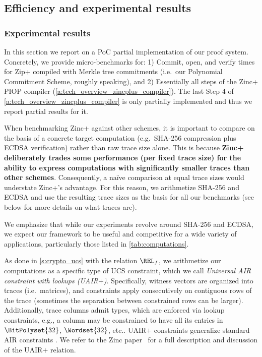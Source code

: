 \subsection{Efficiency and experimental results}
\label{sec:experiments}

\subsubsection{Experimental results}
In this section we report on a PoC partial implementation of our proof system. Concretely, we provide micro-benchmarks for: 1) Commit, open, and verify times for Zip+ compiled with Merkle tree commitments (i.e.\ our Polynomial Commitment Scheme, roughly speaking), and 2) Essentially all steps of the Zinc+ PIOP compiler (\cref{a:tech_overview_zincplus_compiler}). The last Step 4 of \cref{a:tech_overview_zincplus_compiler} is only partially implemented and thus we report partial results for it. 





\begin{remark}\label{rem:zincplus_comparisons}
  When benchmarking Zinc+ against other schemes, it is important to compare on the basis of a concrete target computation (e.g.\ SHA-256 compression plus ECDSA verification) rather than raw trace size alone. This is because \textbf{Zinc+ deliberately trades some performance (per fixed trace size) for the ability to express computations with significantly smaller traces than other schemes}. Consequently, a na\"ive comparison at equal trace sizes would understate Zinc+'s advantage. For this reason, we arithmetize SHA-256 and ECDSA and use the resulting trace sizes as the basis for all our benchmarks (see below for more details on what traces are). %

   We emphasize that while our experiments revolve around SHA-256 and ECDSA, we expect our framework to be useful and competitive for a wide variety of applications, particularly those listed in \cref{tab:computations}.
  \end{remark}


 As done in \cref{s:crypto_ucs} with the relation $\REL_{f}$, 
we arithmetize our computations as a specific type of UCS constraint, which we call \emph{Universal AIR constraint with lookups (UAIR$+$)}. Specifically, witness vectors are organized into traces (i.e.\ matrices), and constraints  apply consecutively on contiguous rows of the trace (sometimes the separation between constrained rows can be larger).%
Additionally, trace columns admit types, which are enforced via lookup constraints, e.g., a column may be constrained to have all its entries in $\BitPolyset{32}$, $\Wordset{32}$, etc.. UAIR$+$ constraints generalize standard AIR constraints \cite{ethstark}. We refer to the Zinc paper~\cite{Zinc} for a full description and discussion of the UAIR$+$ relation.

